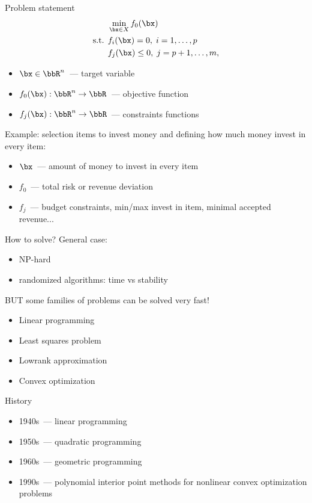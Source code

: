 \documentclass[12pt]{beamer}
\begin{document}
\begin{frame}{Problem statement}
\begin{equation*}
\begin{split}
&\min\limits_{\bx \in X} f_0(\bx)\\
\text{s.t. } & f_i(\bx) = 0, \; i = 1,\ldots,p\\
& f_j(\bx) \leq 0, \; j = p+1,\ldots,m,
\end{split}
\end{equation*}
\begin{itemize}
\item $\bx \in \bbR^n$~--- target variable
\item $f_0(\bx): \bbR^n \rightarrow \bbR$~--- objective function
\item $f_j(\bx): \bbR^n \rightarrow \bbR$~--- constraints functions
\end{itemize}
Example: selection items to invest money and defining how much money invest in every item:
\begin{itemize}
\item $\bx$~--- amount of money to invest in every item
\item $f_0$~--- total risk or revenue deviation
\item $f_j$~--- budget constraints, min/max invest in item, minimal accepted revenue...
\end{itemize}

\end{frame}

\begin{frame}{How to solve?}
General case:
\begin{itemize}
\item NP-hard
\item {\small randomized algorithms: time vs stability}
\end{itemize}

{\small BUT some families of problems can be solved very fast!}

\begin{itemize}
\item Linear programming
\item Least squares problem
\item Lowrank approximation
\item Convex optimization
\end{itemize}
\end{frame}

\begin{frame}{History}

\begin{itemize}
\item 1940s~--- linear programming
\item 1950s~--- quadratic programming
\item 1960s~--- geometric programming
\item 1990s~--- polynomial interior point methods for nonlinear convex optimization problems
\end{itemize}
\end{frame}
\end{document}
